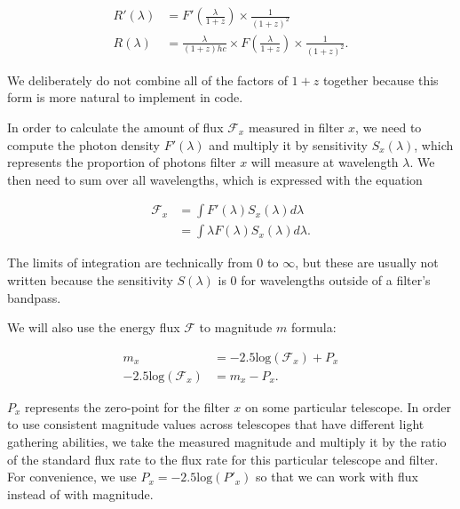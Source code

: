 \documentclass[linenumbers]{aastex631}
\begin{document}
\begin{equation}
\begin{aligned}
\label{eq:redshifted_density}
  R'(\lambda) &= F'\left(\frac{\lambda}{1+z}\right) \times \frac{1}{(1 + z)^2} \\
  R(\lambda) &= \frac{\lambda}{(1+z)hc} \times F\left(\frac{\lambda}{1+z}\right) \times \frac{1}{(1 + z)^2} .
\end{aligned}
\end{equation}

We deliberately do not combine all of the factors of $1+z$ together because
this form is more natural to implement in code.

In order to calculate the amount of flux $\mathcal{F}_x$ measured in filter
$x$, we need to compute the photon density $F'(\lambda)$ and multiply it by
sensitivity $S_x(\lambda)$, which represents the proportion of photons filter $x$
will measure at wavelength $\lambda$. We then need to sum over all wavelengths,
which is expressed with the equation

\begin{equation}
\begin{aligned}
\label{eq:flux_definition}
  \mathcal{F}_x &= \int F'(\lambda) S_x(\lambda) d\lambda \\
                &= \int \lambda F(\lambda) S_x(\lambda) d\lambda.
\end{aligned}
\end{equation}

The limits of integration are technically from 0 to $\infty$, but these are
usually not written because the sensitivity $S(\lambda)$ is 0 for wavelengths
outside of a filter's bandpass.

We will also use the energy flux $\mathcal{F}$ to magnitude $m$ formula:

\begin{equation}
\begin{aligned}
\label{eq:flux2mag}
                             m_x &= -2.5 \text{log}(\mathcal{F}_x) + P_x \\
  -2.5 \text{log}(\mathcal{F}_x) &= m_x - P_x .
\end{aligned}
\end{equation}

$P_x$ represents the zero-point for the filter $x$ on some particular
telescope. In order to use consistent magnitude values across telescopes that
have different light gathering abilities, we take the measured magnitude and
multiply it by the ratio of the standard flux rate to the flux rate for this
particular telescope and filter. For convenience, we use $P_x = -2.5
\text{log}(P'_x)$ so that we can work with flux instead of with magnitude.
\end{document}
